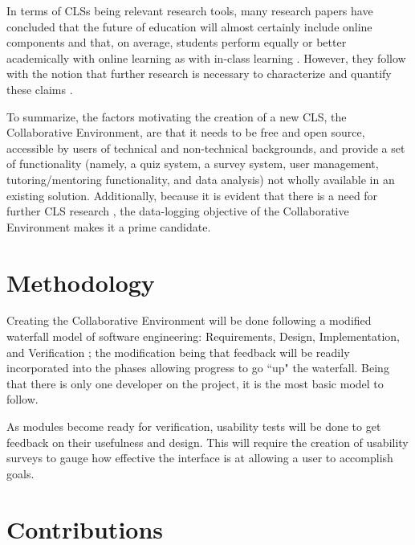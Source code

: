 In terms of CLSs being relevant research tools, many research papers have concluded that the future of education will almost certainly include online components \cite{keeping-pace2-pdf} and that, on average, students perform equally or better academically with online learning as with in-class learning \cite{national-primer-k-12-pdf}. However, they follow with the notion that further research is necessary to characterize and quantify these claims \cite{national-primer-k-12-pdf}.

To summarize, the factors motivating the creation of a new CLS, the Collaborative Environment, are that it needs to be free and open source, accessible by users of technical and non-technical backgrounds, and provide a set of functionality (namely, a quiz system, a survey system, user management, tutoring/mentoring functionality, and data analysis) not wholly available in an existing solution. Additionally, because it is evident that there is a need for further CLS research \cite{keeping-pace2-pdf, national-primer-k-12-pdf}, the data-logging objective of the Collaborative Environment makes it a prime candidate.

\section{Methodology}
\label{sec:methodology}

Creating the Collaborative Environment will be done following a modified waterfall model of software engineering: Requirements, Design, Implementation, and Verification \cite{stober2010agile}; the modification being that feedback will be readily incorporated into the phases allowing progress to go ``up" the waterfall. Being that there is only one developer on the project, it is the most basic model to follow.

As modules become ready for verification, usability tests will be done to get feedback on their usefulness and design. This will require the creation of usability surveys to gauge how effective the interface is at allowing a user to accomplish goals.

\section{Contributions}
\label{sec:objectives}

